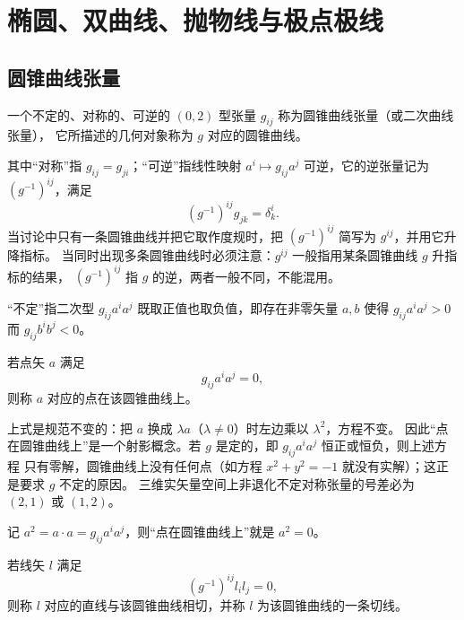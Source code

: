 \chapter{椭圆、双曲线、抛物线与极点极线}

\section{圆锥曲线张量}

\begin{definition}[圆锥曲线张量]
一个不定的、对称的、可逆的 $(0,2)$ 型张量 $g_{ij}$ 称为圆锥曲线张量（或二次曲线张量），
它所描述的几何对象称为 $g$ 对应的圆锥曲线。
\end{definition}

其中“对称”指 $g_{ij}=g_{ji}$；“可逆”指线性映射 $a^i\mapsto g_{ij}a^j$ 可逆，它的逆张量记为
$(g^{-1})^{ij}$，满足
\[
(g^{-1})^{ij}g_{jk}=\delta^i_k .
\]
当讨论中只有一条圆锥曲线并把它取作度规时，把 $(g^{-1})^{ij}$ 简写为 $g^{ij}$，并用它升降指标。
当同时出现多条圆锥曲线时必须注意：$g^{ij}$ 一般指用某条圆锥曲线 $g$ 升指标的结果，
$(g^{-1})^{ij}$ 指 $g$ 的逆，两者一般不同，不能混用。

“不定”指二次型 $g_{ij}a^ia^j$ 既取正值也取负值，即存在非零矢量 $a,b$ 使得
$g_{ij}a^ia^j>0$ 而 $g_{ij}b^ib^j<0$。

\begin{definition}[圆锥曲线上的点]
若点矢 $a$ 满足
\begin{equation}
g_{ij}a^ia^j=0,
\end{equation}
则称 $a$ 对应的点在该圆锥曲线上。
\end{definition}

\begin{remark}
上式是规范不变的：把 $a$ 换成 $\lambda a$（$\lambda\neq0$）时左边乘以 $\lambda^2$，方程不变。
因此“点在圆锥曲线上”是一个射影概念。若 $g$ 是定的，即 $g_{ij}a^ia^j$ 恒正或恒负，则上述方程
只有零解，圆锥曲线上没有任何点（如方程 $x^2+y^2=-1$ 就没有实解）；这正是要求 $g$ 不定的原因。
三维实矢量空间上非退化不定对称张量的号差必为 $(2,1)$ 或 $(1,2)$。
\end{remark}

记 $a^2=a\cdot a=g_{ij}a^ia^j$，则“点在圆锥曲线上”就是 $a^2=0$。

\begin{definition}[切线]
若线矢 $l$ 满足
\begin{equation}
(g^{-1})^{ij}l_il_j=0,
\end{equation}
则称 $l$ 对应的直线与该圆锥曲线相切，并称 $l$ 为该圆锥曲线的一条切线。
\end{definition}

